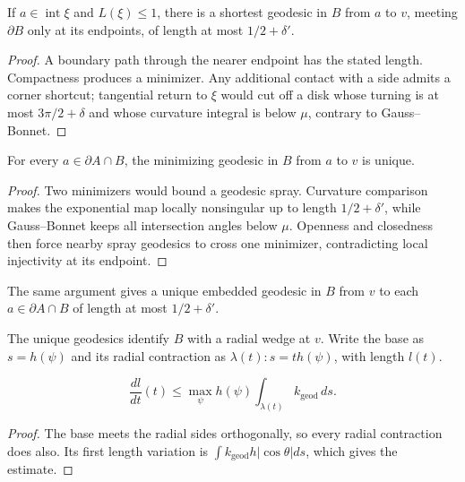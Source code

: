 \begin{claim}
\label{claim:focusing-triangle-vertex-geodesic}
\label{avgeo}
If $a\in\operatorname{int}\xi$ and $L(\xi)\le1$, there is a shortest
geodesic in $B$ from $a$ to $v$, meeting $\partial B$ only at its endpoints,
of length at most $1/2+\delta'$.
\end{claim}
\begin{proof}
\sketch A boundary path through the nearer endpoint has the stated length.
Compactness produces a minimizer. Any additional contact with a side admits a
corner shortcut; tangential return to $\xi$ would cut off a disk whose turning
is at most $3\pi/2+\delta$ and whose curvature integral is below $\mu$, contrary
to Gauss--Bonnet.
\end{proof}

\begin{claim}
\label{claim:focusing-triangle-vertex-geodesic-unique}
For every $a\in\partial A\cap B$, the minimizing geodesic in $B$ from $a$ to
$v$ is unique.
\end{claim}
\begin{proof}
\sketch Two minimizers would bound a geodesic spray. Curvature comparison makes
the exponential map locally nonsingular up to length $1/2+\delta'$, while
Gauss--Bonnet keeps all intersection angles below $\mu$. Openness and closedness
then force nearby spray geodesics to cross one minimizer, contradicting local
injectivity at its endpoint.
\end{proof}

\begin{remark}
\label{rem:focusing-triangle-vertex-geodesic-embedded}
The same argument gives a unique embedded geodesic in $B$ from $v$ to each
$a\in\partial A\cap B$ of length at most $1/2+\delta'$.
\end{remark}

The unique geodesics identify $B$ with a radial wedge at $v$. Write the base as
$s=h(\psi)$ and its radial contraction as $\lambda(t):s=th(\psi)$, with length
$l(t)$.

\begin{claim}
\label{claim:arc-length-derivative-bound}
\[
\frac{dl}{dt}(t)\le\max_\psi h(\psi)
\int_{\lambda(t)}k_{\mathrm{geod}}\,ds.
\]
\end{claim}
\begin{proof}
\sketch The base meets the radial sides orthogonally, so every radial
contraction does also. Its first length variation is
$\int k_{\mathrm{geod}}h|\cos\theta|ds$, which gives the estimate.
\end{proof}

